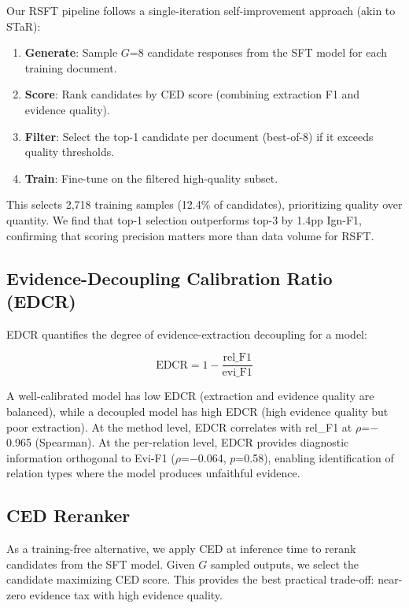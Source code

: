 \documentclass[11pt]{article}
\begin{document}
Our RSFT pipeline follows a single-iteration self-improvement approach (akin to STaR):
\begin{enumerate}
\item \textbf{Generate}: Sample $G$=8 candidate responses from the SFT model for each training document.
\item \textbf{Score}: Rank candidates by CED score (combining extraction F1 and evidence quality).
\item \textbf{Filter}: Select the top-1 candidate per document (best-of-8) if it exceeds quality thresholds.
\item \textbf{Train}: Fine-tune on the filtered high-quality subset.
\end{enumerate}

This selects 2,718 training samples (12.4\% of candidates), prioritizing quality over quantity. We find that top-1 selection outperforms top-3 by 1.4pp Ign-F1, confirming that scoring precision matters more than data volume for RSFT.

\subsection{Evidence-Decoupling Calibration Ratio (EDCR)}

EDCR quantifies the degree of evidence-extraction decoupling for a model:

\begin{equation}
\text{EDCR} = 1 - \frac{\text{rel\_F1}}{\text{evi\_F1}}
\end{equation}

A well-calibrated model has low EDCR (extraction and evidence quality are balanced), while a decoupled model has high EDCR (high evidence quality but poor extraction). At the method level, EDCR correlates with rel\_F1 at $\rho$=$-$0.965 (Spearman). At the per-relation level, EDCR provides diagnostic information orthogonal to Evi-F1 ($\rho$=$-$0.064, $p$=0.58), enabling identification of relation types where the model produces unfaithful evidence.

\subsection{CED Reranker}

As a training-free alternative, we apply CED at inference time to rerank candidates from the SFT model. Given $G$ sampled outputs, we select the candidate maximizing CED score. This provides the best practical trade-off: near-zero evidence tax with high evidence quality.
\end{document}
